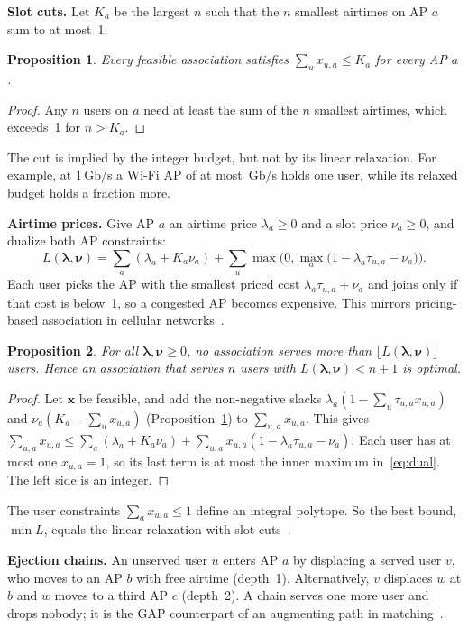 \documentclass[conference]{IEEEtran}
\newtheorem{proposition}{Proposition}
\begin{document}
\textbf{Slot cuts.}
Let $K_a$ be the largest $n$ such that the $n$ smallest airtimes on AP $a$ sum to at most~1.
\begin{proposition}\label{prop:slot}
Every feasible association satisfies $\sum_u x_{u,a}\le K_a$ for every AP $a$.
\end{proposition}
\begin{proof}
Any $n$ users on $a$ need at least the sum of the $n$ smallest airtimes, which exceeds~1 for $n>K_a$.
\end{proof}
The cut is implied by the integer budget, but not by its linear relaxation.
For example, at 1\,Gb/s a Wi-Fi AP of at most \WifiMaxRate\,Gb/s holds one user, while its relaxed budget holds a fraction more.

\textbf{Airtime prices.}
Give AP $a$ an airtime price $\lambda_a\ge0$ and a slot price $\nu_a\ge0$, and dualize both AP constraints:
\begin{equation}
L(\boldsymbol\lambda,\boldsymbol\nu)=\sum_a(\lambda_a+K_a\nu_a)+\sum_u\max\Big(0,\max_a\big(1-\lambda_a\tau_{u,a}-\nu_a\big)\Big).\label{eq:dual}
\end{equation}
Each user picks the AP with the smallest priced cost $\lambda_a\tau_{u,a}+\nu_a$ and joins only if that cost is below~1, so a congested AP becomes expensive.
This mirrors pricing-based association in cellular networks~\cite{shen2014pricing}.
\begin{proposition}\label{prop:dual}
For all $\boldsymbol\lambda,\boldsymbol\nu\ge0$, no association serves more than $\lfloor L(\boldsymbol\lambda,\boldsymbol\nu)\rfloor$ users.
Hence an association that serves $n$ users with $L(\boldsymbol\lambda,\boldsymbol\nu)<n+1$ is optimal.
\end{proposition}
\begin{proof}
Let $\mathbf{x}$ be feasible, and add the non-negative slacks $\lambda_a(1-\sum_u\tau_{u,a}x_{u,a})$ and $\nu_a(K_a-\sum_u x_{u,a})$ (Proposition~\ref{prop:slot}) to $\sum_{u,a}x_{u,a}$.
This gives $\sum_{u,a}x_{u,a}\le\sum_a(\lambda_a+K_a\nu_a)+\sum_{u,a}x_{u,a}(1-\lambda_a\tau_{u,a}-\nu_a)$.
Each user has at most one $x_{u,a}=1$, so its last term is at most the inner maximum in~\eqref{eq:dual}.
The left side is an integer.
\end{proof}
The user constraints $\sum_a x_{u,a}\le1$ define an integral polytope.
So the best bound, $\min L$, equals the linear relaxation with slot cuts~\cite{geoffrion1974lagrangean}.

\textbf{Ejection chains.}
An unserved user $u$ enters AP $a$ by displacing a served user $v$, who moves to an AP $b$ with free airtime (depth~1).
Alternatively, $v$ displaces $w$ at $b$ and $w$ moves to a third AP $c$ (depth~2).
A chain serves one more user and drops nobody; it is the GAP counterpart of an augmenting path in matching~\cite{yagiura2004ejection}.
\end{document}
